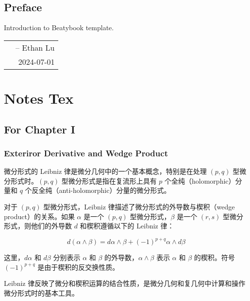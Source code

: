\documentclass[lang=cn,zihao=-4,a4paper,fontset=none]{beautybook}
\begin{document}
\frontmatter
{}

{%
\thispagestyle{empty}
\chapter*{Preface}
Introduction to Beatybook template.


\hfill
\begin{tabular}{lr}
    &-- Ethan Lu\\ 
    &2024-07-01
\end{tabular}
\clearpage}

\thispagestyle{empty}
\tableofcontents%


\mainmatter
{}

\part{Notes Tex}

\chapter{For Chapter I}

\section{Exteriror Derivative and Wedge Product}

微分形式的 Leibniz 律是微分几何中的一个基本概念，特别是在处理 $(p,q)$ 型微分形式时。$(p,q)$ 型微分形式是指在复流形上具有 $p$ 个全纯（holomorphic）分量和 $q$ 个反全纯（anti-holomorphic）分量的微分形式。

对于 $(p,q)$ 型微分形式，Leibniz 律描述了微分形式的外导数与楔积（wedge product）的关系。如果 $\alpha$ 是一个 $(p,q)$ 型微分形式，$\beta$ 是一个 $(r,s)$ 型微分形式，则他们的外导数 $d$ 和楔积遵循以下的 Leibniz 律：

$$
d(\alpha \wedge \beta) = d\alpha \wedge \beta + (-1)^{p+q} \alpha \wedge d\beta
$$

这里，$d\alpha$ 和 $d\beta$ 分别表示 $\alpha$ 和 $\beta$ 的外导数，$\alpha \wedge \beta$ 表示 $\alpha$ 和 $\beta$ 的楔积。符号 $(-1)^{p+q}$ 是由于楔积的反交换性质。

Leibniz 律反映了微分和楔积运算的结合性质，是微分几何和复几何中计算和操作微分形式时的基本工具。
\end{document}
